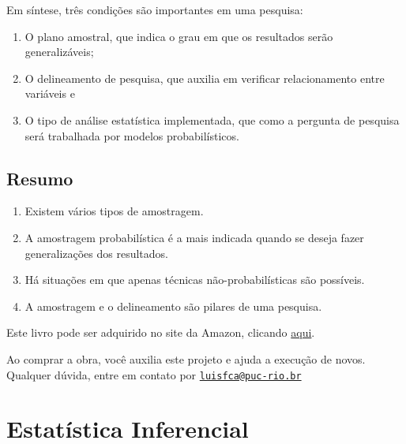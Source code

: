 \documentclass[
]{book}
\providecommand{\tightlist}{%
  \setlength{\itemsep}{0pt}\setlength{\parskip}{0pt}}
\begin{document}
Em síntese, três condições são importantes em uma pesquisa:

\begin{enumerate}
\def\labelenumi{(\arabic{enumi})}
\tightlist
\item
  O plano amostral, que indica o grau em que os resultados serão generalizáveis;
\item
  O delineamento de pesquisa, que auxilia em verificar relacionamento entre variáveis e\\
\item
  O tipo de análise estatística implementada, que como a pergunta de pesquisa será trabalhada por modelos probabilísticos.
\end{enumerate}

\hypertarget{resumo-4}{%
\section{Resumo}\label{resumo-4}}

\begin{enumerate}
\def\labelenumi{\arabic{enumi}.}
\tightlist
\item
  Existem vários tipos de amostragem.\\
\item
  A amostragem probabilística é a mais indicada quando se deseja fazer generalizações dos resultados.\\
\item
  Há situações em que apenas técnicas não-probabilísticas são possíveis.\\
\item
  A amostragem e o delineamento são pilares de uma pesquisa.\\
\end{enumerate}

Este livro pode ser adquirido no site da Amazon, clicando \href{https://www.amazon.com.br/gp/product/B097CP7T9M?pf_rd_r=RDZC8XYMBC1WY69T0J8K\&pf_rd_p=abb22e6b-8812-4b76-a424-5f0b098d2c90\&pd_rd_r=ceec1911-f409-4acd-ac8f-2d5bc68dac43\&pd_rd_w=wMUzJ\&pd_rd_wg=ZK85a\&ref_=pd_gw_unk}{aqui}.

Ao comprar a obra, você auxilia este projeto e ajuda a execução de novos. Qualquer dúvida, entre em contato por \href{mailto:luisfca@puc-rio.br}{\nolinkurl{luisfca@puc-rio.br}}

\hypertarget{estatuxedstica-inferencial}{%
\chapter{Estatística Inferencial}\label{estatuxedstica-inferencial}}
\end{document}
